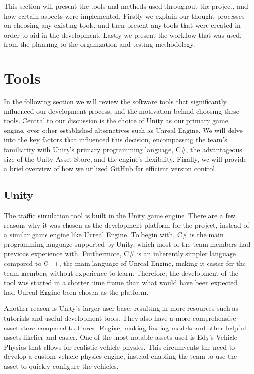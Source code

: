 
This section will present the tools and methods used throughout the project, and how certain aspects were implemented. Firstly we explain our thought processes on choosing any existing tools, and then present any tools that were created in order to aid in the development. Lastly we present the workflow that was used, from the planning to the organization and testing methodology.

\section{Tools}
    In the following section we will review the software tools that significantly influenced our development process, and the motivation behind choosing these tools. Central to our discussion is the choice of Unity as our primary game engine, over other established alternatives such as Unreal Engine. We will delve into the key factors that influenced this decision, encompassing the team's familiarity with Unity's primary programming language, C\#, the advantageous size of the Unity Asset Store, and the engine's flexibility. Finally, we will provide a brief overview of how we utilized GitHub for efficient version control.

    \subsection{Unity}
        The traffic simulation tool is built in the Unity game engine. There are a few reasons why it was chosen as the development platform for the project, instead of a similar game engine like Unreal Engine. To begin with, C\# is the main programming language supported by Unity, which most of the team members had previous experience with. Furthermore, C\# is an inherently simpler language compared to C++, the main language of Unreal Engine, making it easier for the team members without experience to learn. Therefore, the development of the tool was started in a shorter time frame than what would have been expected had Unreal Engine been chosen as the platform.

        Another reason is Unity's larger user base, resulting in more resources such as tutorials and useful development tools. They also have a more comprehensive asset store compared to Unreal Engine, making finding models and other helpful assets likelier and easier. One of the most notable assets used is Edy's Vehicle Physics that allows for realistic vehicle physics\cite{edy}. This circumvents the need to develop a custom vehicle physics engine, instead enabling the team to use the asset to quickly configure the vehicles.

